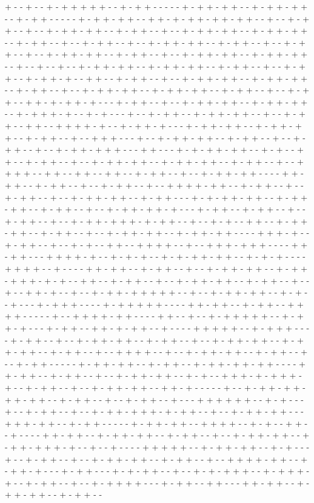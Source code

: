 + - - + - - + - + + + + + - - + - + + - - - - - + - + + - + + - - + - + + - + + - - + - + + - - - - - + - + + - + + - - + + - + - + + - + + - + + - - + - - + - + + - - + - - + - + + - + + - - + - + + - - + - - + - + + - + + - - + - + + - + + - - + - + + - - + - - + - + + - - + - - + - + + - + + - - + - + + - - + - - + - + + - - + - - + - + + - + + - - + - + + - - + - - + - + + - + + - - + - + + - + + - - + - - + - - + - - + - + + - + + - - + - + + - + + - - + - + + - - + - - + - + + - - + - + + - + - - + + - - + - + + - - + - - + - + + - + + - - + - + + - + + - - + - + + - - + - - + - + + - + + - - + - + + - + + - - + - + + - - + - - + - + + - - + + - + - + + - + - - - + - + + - - + - - + - + + - + + - - + - + + - + + - - + - + + + - + - - + - + - - - + - - + - + + - - + - + + - + + - - + - - + - + + - - + + - - + + + + - + - - + - + + - + - - - + - + + - + + - - + - + + - + + - - + - + + - - + - - + + + - - - + - - + - + + - + + - - + - + + - - + - - + - + + - - + - - + - + + - + + + - - - + + - - - + - + - + + - + + - - + - + - - + + - - + - + + - - + - - + - + + - + + - - + - + + - + + - - + - + + - - + - - + + + + - - + + - - + + - - + + - - + - + + - - + - - + - + + - + + - - - - + + - + + - - + - + + - - + - - + - + + - - + - - + + + + - + + - - + - + + - - + - - + - + + - - + - - + - + + - + + - - + - + + - - - + - + - + + - + + - - + - + + - + + - - + - + + - - + - - + - + + - + + - + - - - + - + + - - + - + + - - + - - + - + + - - + - - + - + + - + + + - + - + + - - + - - + - + - - + + - - + - + + - + + - - + - + + - - + - - + - + + - + + - - + - + + - + + - - - - + + + - + - - + - + + - - + - - + - + - - + + - - + + + + - - + - - + + + - + + + - - - - + + - + + - - - + + + + - + - - + - + - + - - + - + - + + - + + - - + - + - + - - - - + + + + - - + - - - - + + - + + - - + - + + - - + - - + - + + - + + - - + - + + - + + + - + - + - - + + - - + - + + - - + - - + - + + - + + - - + - + + - - + - - + - - + + - + - - + - - + - + + - + + + + + - - + - - + - + + - + + - - + - + - - + - - - + - + + + - - - - + - + + + + + - - - - + + - + + - - + - + + - - + + + + - - - - - + - - + + + + - + + - - - - + + - - + - - + - + + + + + - - + - + + - + - - - + - + + - - + + - + - + + - - + - - - - + + + + + - - + - + + + - - - - + - + + - - + - - + - + + - + + - - + - + + - - + - - + - + + - + + - - + - + + - + + - - + - + + - - + - - + + + + - - + - - + - + + - + + - - + - + + - - + - - + - + + - - - - - + - + + - + + - - + - + + - - + - + + - + + - + + - - - - + + - + + - - + - + + - - + - - + - + + - + + - - + - + - - + + + - + - + + + - + - - + - + + - - + - - + - + + - + + - - + + - + - - - - - + - - + - + + - + + - + + - + + - - + - + + - - + - - + - + + - - + - - - + + + + + + - - + - + - - - + - - + - + + - - + - - + - + + - + + + - + - + + - - + - - + - + + - + + - - - + + + - + + - - + - + + - - - - - + - + + - + + - - + + + + - - + - + - - + + - - + - - - - + + - + + - - + - + + - + + - - + - + + - - + - - + - + + - + + - - + - + + - + + + - + - - + - - + - - - - + + + + + - - + - + + - + + - - + - + - - - + - - + - + + - - + - - + - + + - + + - - + - + + - - + - - + + + + - + + - - + - + + - + - - - + - + + - - - + - + - + + - - + - - + - + - + + + - - + - + + + - + - - + - + + - - + - - + - + + + + - - - + - + + - - + + - - - + + - + + - - + - + + - + + - - + - + + - - 